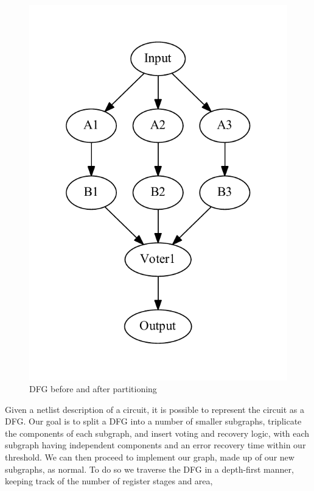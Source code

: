 \documentclass[12pt,final,oneside]{dwThesis} %
\begin{document}
\begin{figure}
\begin{center}
         \includegraphics[height=0.3\textheight]{images/TMR-post.pdf}
         \caption{\gls{DFG} before and after partitioning} \label{TMRFigure}

      \end{center}

   \end{figure}
   Given a netlist description of a circuit, it is
   possible to represent the circuit as a \gls{DFG}\cite{FPGAArch}. Our goal is
   to split a \gls{DFG} into a number of smaller subgraphs, triplicate the
   components of each subgraph, and insert voting and recovery logic, with each
   subgraph having independent components and an error recovery time within our
   threshold. We can then proceed to implement our graph, made up of our new
   subgraphs, as normal.  To do so we traverse the \gls{DFG} in a depth-first
   manner, keeping track of the number of register stages and area,
\end{document}
